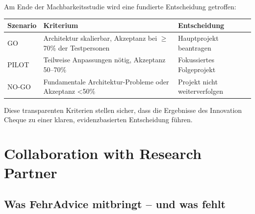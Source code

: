 \documentclass[11pt,a4paper]{article}
\begin{document}
Am Ende der Machbarkeitsstudie wird eine fundierte Entscheidung getroffen:

\begin{table}[h]
\centering
\begin{tabular}{@{}L{2cm}L{7cm}L{4cm}@{}}
\toprule
\textbf{Szenario} & \textbf{Kriterium} & \textbf{Entscheidung} \\
\midrule
GO & Architektur skalierbar, Akzeptanz bei $\geq$70\% der Testpersonen & Hauptprojekt beantragen \\
PILOT & Teilweise Anpassungen nötig, Akzeptanz 50--70\% & Fokussiertes Folgeprojekt \\
NO-GO & Fundamentale Architektur-Probleme oder Akzeptanz <50\% & Projekt nicht weiterverfolgen \\
\bottomrule
\end{tabular}
\end{table}

Diese transparenten Kriterien stellen sicher, dass die Ergebnisse des Innovation Cheque zu einer klaren, evidenzbasierten Entscheidung führen.

\vspace{1cm}

\newpage


\section{Collaboration with Research Partner}

\subsection{Was FehrAdvice mitbringt -- und was fehlt}
\end{document}
